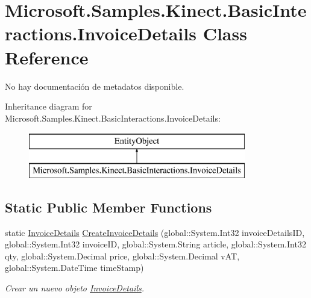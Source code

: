 \hypertarget{class_microsoft_1_1_samples_1_1_kinect_1_1_basic_interactions_1_1_invoice_details}{\section{Microsoft.\-Samples.\-Kinect.\-Basic\-Interactions.\-Invoice\-Details Class Reference}
\label{class_microsoft_1_1_samples_1_1_kinect_1_1_basic_interactions_1_1_invoice_details}
}


No hay documentación de metadatos disponible.  


Inheritance diagram for Microsoft.\-Samples.\-Kinect.\-Basic\-Interactions.\-Invoice\-Details\-:\begin{figure}[H]
\begin{center}
\leavevmode
\includegraphics[height=2.000000cm]{class_microsoft_1_1_samples_1_1_kinect_1_1_basic_interactions_1_1_invoice_details}
\end{center}
\end{figure}
\subsection*{Static Public Member Functions}
\begin{DoxyCompactItemize}
\item 
static \hyperlink{class_microsoft_1_1_samples_1_1_kinect_1_1_basic_interactions_1_1_invoice_details}{Invoice\-Details} \hyperlink{class_microsoft_1_1_samples_1_1_kinect_1_1_basic_interactions_1_1_invoice_details_a074ea97aa8685804a4b2dd5d82f361c9}{Create\-Invoice\-Details} (global\-::\-System.\-Int32 invoice\-Details\-I\-D, global\-::\-System.\-Int32 invoice\-I\-D, global\-::\-System.\-String article, global\-::\-System.\-Int32 qty, global\-::\-System.\-Decimal price, global\-::\-System.\-Decimal v\-A\-T, global\-::\-System.\-Date\-Time time\-Stamp)
\begin{DoxyCompactList}\small\item\em Crear un nuevo objeto \hyperlink{class_microsoft_1_1_samples_1_1_kinect_1_1_basic_interactions_1_1_invoice_details}{Invoice\-Details}. \end{DoxyCompactList}\end{DoxyCompactItemize}
